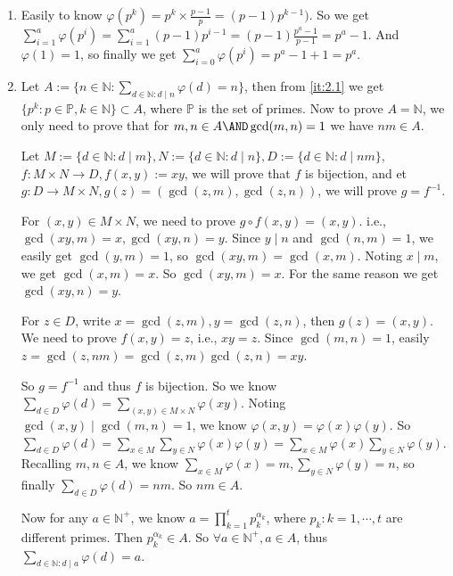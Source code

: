 \documentclass{ctexart}
\renewcommand{\phi}{\varphi}
\begin{document}
\begin{solution}
  \begin{enumerate}
    \item \label{it:2.1} Easily to know \(\phi(p^k)=p^k \times \frac{p-1}{p}=(p-1)p^{k-1} )\).
      So we get \(\sum_{i=1}^{a}\phi(p^i)=\sum_{i=1}^{a}(p-1)p^{i-1}=(p-1) \frac{p^a-1}{p-1}=p^a-1\).
      And \(\phi(1)=1\), so finally we get \(\sum_{i=0}^{a}\phi(p^i)=p^a-1+1=p^a\).
    \item Let \(A:=\{n \in \mathbb{N}: \sum_{d \in \mathbb{N}:d \mid n}\phi(d)=n\}\), then from \ref{it:2.1} we get \(\{p^k:p \in \mathbb{P},k \in \mathbb{N}\} \subset A\),
      where \(\mathbb{P}\) is the set of primes.
      Now to prove \(A=\mathbb{N}\), we only need to prove that for \(m,n \in A \AND \gcd(m,n)=1\) we have \(nm \in A\).

      Let \(M:=\{d \in \mathbb{N}:d \mid m\},N:=\{d \in \mathbb{N}:d \mid n\},D:=\{d \in \mathbb{N}:d \mid nm\}\),
      \(f:M \times N \to D,f(x,y):=xy\), we will prove that \(f\) is bijection,
      and et \(g:D \to M \times N,g(z)=(\gcd(z,m),\gcd(z,n))\), we will prove \(g=f^{-1}\).

      For \((x,y)\in M \times N\), we need to prove \(g \circ f (x,y)=(x,y)\). i.e., \(\gcd(xy,m)=x,\gcd(xy,n)=y\).
      Since \(y \mid n\) and \(\gcd(n,m)=1\), we easily get \(\gcd(y,m)=1\), so \(\gcd(xy,m)=\gcd(x,m)\).
      Noting \(x \mid m\), we get \(\gcd(x,m)=x\). So \(\gcd(xy,m)=x\).
      For the same reason we get \(\gcd(xy,n)=y\).

      For \(z \in D\), write \(x=\gcd(z,m),y=\gcd(z,n)\), then \(g(z)=(x,y)\).
      We need to prove \(f(x,y)=z\), i.e., \(xy=z\).
      Since \(\gcd(m,n)=1\), easily \(z = \gcd(z,nm) = \gcd(z,m)\gcd(z,n)=xy\).

      So \(g=f^{-1}\) and thus \(f\) is bijection.
      So we know \(\sum_{d \in D}\phi(d)=\sum_{(x,y)\in M \times N}\phi(xy)\).
      Noting \(\gcd(x,y)\mid \gcd(m,n)=1\), we know \(\phi(x,y)=\phi(x)\phi(y)\).
      So \(\sum_{d \in D}\phi(d)=\sum_{x \in M}\sum_{y \in N}\phi(x)\phi(y)=\sum_{x \in M}\phi(x)\sum_{y \in N}\phi(y)\).
      Recalling \(m,n \in A\), we know \(\sum_{x \in M}\phi(x)=m,\sum_{y \in N}\phi(y)=n\), so finally \(\sum_{d \in D}\phi(d)=nm\).
      So \(nm \in A\).

      Now for any \(a \in \mathbb{N}^+\), we know \(a=\prod_{k=1}^{t}p_k^{\alpha_k}\), where \(p_k:k=1,\cdots,t\) are different primes.
      Then \(p_k^{\alpha_k}\in A\).
      So \(\forall a \in \mathbb{N}^+,a \in A\), thus \(\sum_{d \in \mathbb{N}:d \mid a}\phi(d)=a\).
  \end{enumerate}
\end{solution}
\end{document}

